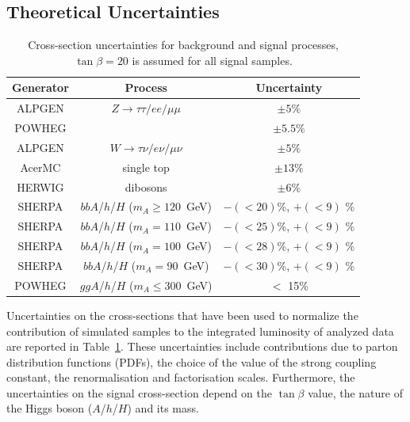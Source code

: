 \subsection{Theoretical Uncertainties}
\label{sec:sys_theory}


\begin{table} [!t]
\centering
\begin{tabular}{c c c }
\hline
\hline
Generator & Process & Uncertainty \\ [0.5ex]
\hline
ALPGEN & $Z \rightarrow \tau\tau / ee /\mu\mu$ & $\pm 5\%$ \\
POWHEG & \ttbar					& $\pm 5.5\%$\\
ALPGEN & $W  \rightarrow \tau\nu / e\nu /\mu\nu$&  $\pm  5\%$ \\
AcerMC & single top & $\pm 13 \%$ \\
HERWIG & dibosons & $\pm 6 \%$ \\
SHERPA & $bbA$/$h$/$H$  ($m_{A} \ge 120$~GeV)     & $-(<20)$\%,  $+(<9)$ \%\\
SHERPA & $bbA$/$h$/$H$  ($m_{A} =   110$~GeV)     & $-(<25)$\%,  $+(<9)$ \%\\
SHERPA & $bbA$/$h$/$H$  ($m_{A} =   100$~GeV)     & $-(<28)$\%,  $+(<9)$ \%\\
SHERPA & $bbA$/$h$/$H$  ($m_{A} =    90$~GeV)     & $-(<30)$\%,  $+(<9)$ \%\\
POWHEG & $ggA$/$h$/$H$  ($m_{A} \le 300$~GeV)     & $<$ 15\%\\  [0.5ex]
\hline \hline 
\end{tabular}
\caption{Cross-section uncertainties for background and signal processes, $\tan\beta = 20$ is assumed for all signal samples.}
\label{table:sys_xsec}
\end{table}


Uncertainties on the cross-sections that have been used to normalize
the contribution of simulated samples to the integrated luminosity of analyzed data are reported in
Table~\ref{table:sys_xsec}. These
uncertainties include contributions due to parton distribution
functions (PDFs), the choice of the value of the strong coupling constant,
the renormalisation and factorisation scales.  Furthermore, the
uncertainties on the signal cross-section depend on the  $\tan\beta$ value, the nature of the 
Higgs boson ($A$/$h$/$H$) and its mass.

